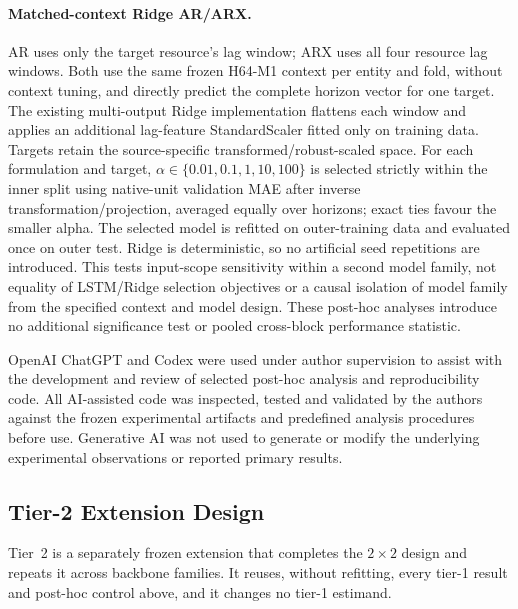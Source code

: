 \documentclass[a4paper,fleqn]{cas-dc}
\begin{document}
\paragraph{Matched-context Ridge AR/ARX.}
AR uses only the target resource's lag window; ARX uses all four resource lag
windows. Both use the same frozen H64-M1 context per entity and fold, without
context tuning, and directly predict the complete horizon vector for one
target. The existing multi-output Ridge implementation flattens each window
and applies an additional lag-feature StandardScaler fitted only on training
data. Targets retain the source-specific transformed/robust-scaled space.
For each formulation and target, $\alpha\in\{0.01,0.1,1,10,100\}$ is selected
strictly within the inner split using native-unit validation MAE after inverse
transformation/projection, averaged equally over horizons; exact ties favour
the smaller alpha. The selected model is refitted on outer-training data and
evaluated once on outer test. Ridge is deterministic, so no artificial seed
repetitions are introduced. This tests input-scope sensitivity within a
second model family, not equality of LSTM/Ridge selection objectives or a
causal isolation of model family from the specified context and model design.
These post-hoc analyses introduce no additional significance test or pooled
cross-block performance statistic.

OpenAI ChatGPT and Codex were used under author supervision to assist with the
development and review of selected post-hoc analysis and reproducibility code.
All AI-assisted code was inspected, tested and validated by the authors against
the frozen experimental artifacts and predefined analysis procedures before
use. Generative AI was not used to generate or modify the underlying
experimental observations or reported primary results.

\subsection{Tier-2 Extension Design}
\label{sec:tier2-design}

Tier~2 is a separately frozen extension that completes the $2\times2$ design
and repeats it across backbone families. It reuses, without refitting, every
tier-1 result and post-hoc control above, and it changes no tier-1 estimand.
\end{document}
